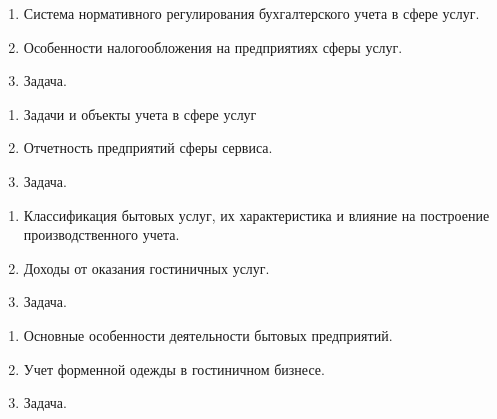 


\shapkFull
\setcounter{zad}{0}

\begin{enumerate}
	\item Система нормативного регулирования бухгалтерского учета в сфере услуг.

	\item Особенности налогообложения на предприятиях сферы услуг.
	\item Задача.
\end{enumerate}

\newpage


\shapkFull
\setcounter{zad}{0}

\begin{enumerate}
	\item Задачи и объекты учета в сфере услуг

	\item Отчетность предприятий сферы сервиса.

	\item Задача.
\end{enumerate}

\newpage


\shapkFull
\setcounter{zad}{0}

\begin{enumerate}
	\item Классификация бытовых услуг, их характеристика и влияние на построение производственного учета.

	\item Доходы от оказания гостиничных услуг.

	\item Задача.
\end{enumerate}

\newpage


\shapkFull
\setcounter{zad}{0}

\begin{enumerate}
	\item Основные особенности деятельности бытовых предприятий.

	\item Учет форменной одежды в гостиничном бизнесе.

	\item Задача.
\end{enumerate}

